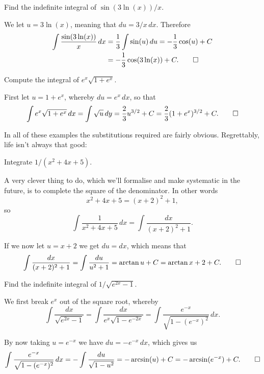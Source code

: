 \begin{example}
	Find the indefinite integral of $\sin(3 \ln(x)) / x$.

	We let $u = 3 \ln(x)$, meaning that $d u = 3 / x \, d x$.
	Therefore
	\begin{align*}
		\int \frac{\sin(3 \ln(x))}{x} \, d x & = \frac{1}{3} \int \sin(u) \, d u = - \frac{1}{3} \cos(u) + C \\
		                                     & = - \frac{1}{3} \cos(3 \ln(x)) + C. \qedhere
	\end{align*}
\end{example}

\begin{example}
	Compute the integral of $e^x \sqrt{1 + e^x}$.

	First let $u = 1 + e^x$, whereby $d u = e^x \, d x$, so that
	\[
		\int e^x \sqrt{1 + e^x} \, d x = \int \sqrt{u} \, d y = \frac{2}{3} u^{3 / 2} + C = \frac{2}{3} ( 1 + e^x )^{3 / 2} + C. \qedhere
	\]
\end{example}

\noindent
In all of these examples the substitutions required are fairly obvious.
Regrettably, life isn't always that good:

\begin{example}
	Integrate $1 / (x^2 + 4 x + 5)$.

	A very clever thing to do, which we'll formalise and make systematic in the future, is to complete the square of the denominator.
	In other words
	\[
		x^2 + 4 x + 5 = (x + 2)^2 + 1,
	\]
	so
	\[
		\int \frac{1}{x^2 + 4 x + 5} \, d x = \int \frac{d x}{(x + 2)^2 + 1}.
	\]

	\noindent
	If we now let $u = x + 2$ we get $d u = d x$, which means that
	\[
		\int \frac{d x}{(x + 2)^2 + 1} = \int \frac{d u}{u^2 + 1} = \arctan{u} + C = \arctan{x + 2} + C. \qedhere
	\]
\end{example}

\begin{example}
	Find the indefinite integral of $1 / \sqrt{e^{2 x} - 1}$.

	We first break $e^x$ out of the square root, whereby
	\[
		\int \frac{d x}{\sqrt{e^{2 x} - 1}} = \int \frac{d x}{e^x \sqrt{1 - e^{- 2x}}} = \int \frac{e^{-x}}{\sqrt{1 - (e^{- x})^2}} \, d x.
	\]

	\noindent
	By now taking $u = e^{-x}$ we have $d u = - e^{-x} \, d x$, which gives us
	\[
		\int \frac{e^{-x}}{\sqrt{1 - (e^{- x})^2}} \, d x = - \int \frac{d u}{\sqrt{1 - u^2}} = - \arcsin(u) + C = - \arcsin(e^{-x}) + C. \qedhere
	\]
\end{example}

